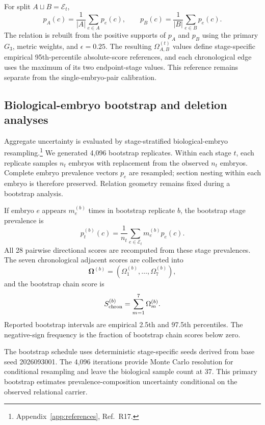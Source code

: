 \documentclass[11pt]{article}
\begin{document}
For split \(A\sqcup B=\mathcal E_t\),
\[
p_A(c)=\frac1{|A|}\sum_{e\in A}p_e(c),
\qquad
p_B(c)=\frac1{|B|}\sum_{e\in B}p_e(c).
\]
The relation is rebuilt from the positive supports of \(p_A\) and \(p_B\) using the primary \(G_3\), metric weights, and \(\epsilon=0.25\). The resulting \(\Omega_{A,B}^{(t)}\) values define stage-specific empirical 95th-percentile absolute-score references, and each chronological edge uses the maximum of its two endpoint-stage values. This reference remains separate from the single-embryo-pair calibration.

\subsection{Biological-embryo bootstrap and deletion analyses}

Aggregate uncertainty is evaluated by stage-stratified biological-embryo resampling.\footnote{Appendix~\ref{app:references}, Ref.~R17.} We generated 4,096 bootstrap replicates. Within each stage \(t\), each replicate samples \(n_t\) embryos with replacement from the observed \(n_t\) embryos. Complete embryo prevalence vectors \(p_e\) are resampled; section nesting within each embryo is therefore preserved. Relation geometry remains fixed during a bootstrap analysis.

If embryo \(e\) appears \(m_e^{(b)}\) times in bootstrap replicate \(b\), the bootstrap stage prevalence is
\begin{equation}
p_t^{(b)}(c)
=
\frac1{n_t}
\sum_{e\in\mathcal E_t}
m_e^{(b)}p_e(c).
\label{eq:bootstageprev}
\end{equation}
All 28 pairwise directional scores are recomputed from these stage prevalences. The seven chronological adjacent scores are collected into
\[
\boldsymbol\Omega^{(b)}
=
\left(
\Omega_1^{(b)},\ldots,\Omega_7^{(b)}
\right),
\]
and the bootstrap chain score is
\begin{equation}
S_{\rm chron}^{(b)}
=
\sum_{m=1}^{7}\Omega_m^{(b)}.
\label{eq:bootscore}
\end{equation}
Reported bootstrap intervals are empirical 2.5th and 97.5th percentiles. The negative-sign frequency is the fraction of bootstrap chain scores below zero.

The bootstrap schedule uses deterministic stage-specific seeds derived from base seed 2026093001. The 4,096 iterations provide Monte Carlo resolution for conditional resampling and leave the biological sample count at 37. This primary bootstrap estimates prevalence-composition uncertainty conditional on the observed relational carrier.
\end{document}
